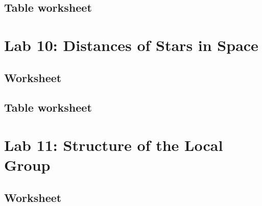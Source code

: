 \documentclass[12pt]{article}
\begin{document}
\subsection{Table worksheet}
\newpage

\section{Lab 10: Distances of Stars in Space}
\subsection{Worksheet}

\newpage
\subsection{Table worksheet}
\newpage

\section{Lab 11: Structure of the Local Group}
\subsection{Worksheet}
%
\end{document}
